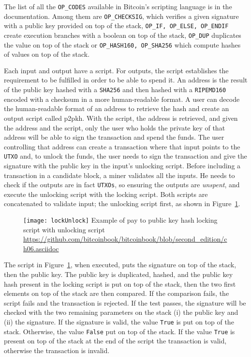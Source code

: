The list of all the \texttt{OP\_CODES} available in Bitcoin's scripting language
is in the documentation. Among them are \texttt{OP\_CHECKSIG}, which verifies a given
signature with a public key provided on top of the stack, \texttt{OP\_IF, OP\_ELSE,
OP\_ENDIF} create execution branches with a boolean on top of the stack,
\texttt{OP\_DUP} duplicates the value on top of the stack or \texttt{OP\_HASH160,
OP\_SHA256} which compute hashes of values on top of the stack.

Each input and output have a script. For outputs, the script establishes the
requirement to be fulfilled in order to be able to spend it. An address is the result
of the public key hashed with a \texttt{SHA256} and then hashed with a
\texttt{RIPEMD160} encoded with a checksum in a more human-readable format. A
user can decode the human-readable format of an address to retrieve the hash
and create an output script called \gls{p2pkh}. With the script, the
address is retrieved, and given the address and the script, only the user who
holds the private key of that address will be able to sign the transaction and
spend the funds. The user controlling that address can create a transaction where that
input points to the \texttt{UTXO} and, to unlock the funds, the user needs to sign
the transaction and give the signature with the public key in the input's
unlocking script. Before including a transaction in a candidate block, a miner
validates all the inputs. He needs to check if the outputs are in fact
\texttt{UTXOs}, so ensuring the outputs are \textit{unspent}, and execute the
unlocking script with the locking script. Both scripts are concatenated to
validate input; the unlocking script first, as shown in
Figure~\ref{fig:lockUnlock}.

\begin{figure}[H]
	\centering
	\texttt{[image: lockUnlock]}
  {Example of pay to public key hash locking script with unlocking script}
	{\url{https://github.com/bitcoinbook/bitcoinbook/blob/second_edition/ch06.asciidoc}}
	\label{fig:lockUnlock}
\end{figure}

The script in Figure~\ref{fig:lockUnlock}, when executed, puts the signature on
top of the stack, then the public key. The public key is duplicated, hashed,
and the public key hash present in the locking script is put on top of the stack,
then the two first elements on top of the stack are then compared. If the
comparison fails, the script fails and the transaction is rejected. If the
test passes, the signature will be checked with the two remaining parameters on
the stack (i) the public key and (ii) the signature. If the signature is valid, the
value \texttt{True} is put on top of the stack. Otherwise, the
value \texttt{False} put on top of the stack. If the value \texttt{True} is present
on top of the stack at the end of the script the transaction is valid,
otherwise the transaction is invalid.

